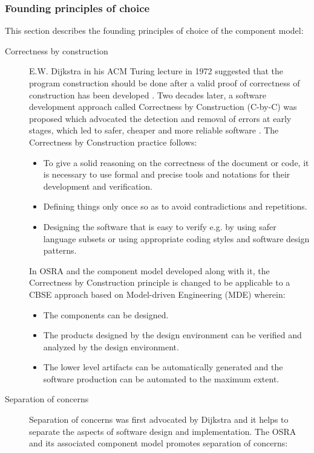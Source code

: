 \subsubsection{\textbf{Founding principles of choice}}
This section describes the founding principles of choice of the component model:

\begin{description}
\item[Correctness by construction] E.W. Dijkstra in his ACM Turing lecture in 1972 suggested that the program construction should be done after a valid proof of correctness of construction has been developed \cite{CompBasedProcess}. Two decades later, a software development approach called Correctness by Construction (C-by-C) was proposed which advocated the detection and removal of errors at early stages, which led to safer, cheaper and more reliable software \cite{CompBasedProcess}\cite{PhdThesis}. The Correctness by Construction practice follows:
\begin{itemize}
\item To give a solid reasoning on the correctness of the document or code, it is necessary to use formal and precise tools and notations for their development and verification. 
\item Defining things only once so as to avoid contradictions and repetitions.
\item Designing the software that is easy to verify e.g. by using safer language subsets or using appropriate coding styles and software design patterns. 
\end{itemize}

In OSRA and the component model developed along with it, the Correctness by Construction principle is changed to be applicable to a CBSE approach based on Model-driven Engineering (MDE) \cite{CompBasedProcess} wherein:

\begin{itemize}
\item The components can be designed.
\item The products designed by the design environment can be verified and analyzed by the design environment.
\item The lower level artifacts can be automatically generated and the software production can be automated to the maximum extent.  
\end{itemize}

\item [Separation of concerns] 
\label{section: Founding principle-Separation of concerns} 
Separation of concerns was first advocated by Dijkstra \cite{CompBasedProcess} and it helps to separate the aspects of software design and implementation. The OSRA and its associated component model promotes separation of concerns\cite{CompBasedProcess}\cite{PhdThesis}:


\end{description}
